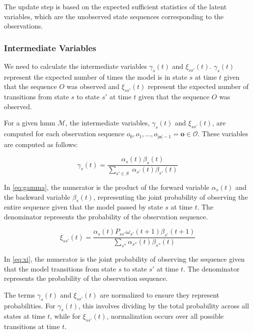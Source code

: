 The update step is based on the expected sufficient statistics of the latent variables, which are the unobserved state sequences corresponding to the observations.

\subsubsection{Intermediate Variables}
We need to calculate the intermediate variables $\gamma_s(t)$ and $\xi_{ss'}(t)$.
$\gamma_s(t)$ represent the expected number of times the model is in state $s$ at time $t$ given that the sequence $O$ was observed and $\xi_{ss'}(t)$ represent the expected number of transitions from state $s$ to state $s'$ at time $t$ given that the sequence $O$ was observed.

For a given \gls{hmm} $\mathcal{M}$, the intermediate variables, $\gamma_s(t)$ and $\xi_{ss'}(t)$, are computed for each observation sequence $o_0, o_1, \dots, o_{|\mathbf{o}|-1} = \mathbf{o} \in \mathcal{O}$.
These variables are computed as follows:

\begin{equation}
    \gamma_s(t) = \frac{\alpha_s(t) \beta_s(t)}{\sum_{s' \in S} \;\alpha_{s'}(t) \beta_{s'}(t)}
    \label{eq:gamma}
\end{equation}

In \autoref{eq:gamma}, the numerator is the product of the forward variable $\alpha_s(t)$ and the backward variable $\beta_s(t)$, representing the joint probability of observing the entire sequence given that the model passed by state $s$ at time $t$.
The denominator represents the probability of the observation sequence.

\begin{equation}
    \xi_{ss'}(t) = \frac{\alpha_s(t) P_{ss'} \omega_{s'}(t + 1) \beta_{s'}(t + 1)}
    {\sum_{s''}\alpha_{s''}(t) \beta_{s''}(t)}
    \label{eq:xi}
\end{equation}


In \autoref{eq:xi}, the numerator is the joint probability of observing the sequence given that the model transitions from state $s$ to state $s'$ at time $t$.
The denominator represents the probability of the observation sequence.

The terms $\gamma_s(t)$ and $\xi_{ss'}(t)$ are normalized to ensure they represent probabilities.
For $\gamma_s(t)$, this involves dividing by the total probability across all states at time $t$, while for $\xi_{ss'}(t)$, normalization occurs over all possible transitions at time $t$.

